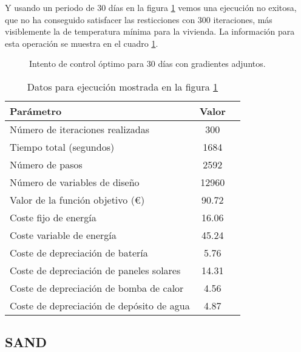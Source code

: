 Y usando un periodo de 30 días en la figura \ref{fig:control_adjoints_30_days}
vemos una ejecución no exitosa, que no ha conseguido satisfacer las
resticciones con 300 iteraciones, más visiblemente la de temperatura mínima
para la vivienda. La información para esta operación se muestra en el cuadro
\ref{tab:control_adjoints_30_days}.

\begin{figure}[h] \centering
	\centering
	
	\caption{Intento de control óptimo para 30 días con gradientes adjuntos.}
	\label{fig:control_adjoints_30_days}
\end{figure}

\begin{table}[ht]
	\centering
	\caption{Datos para ejecución mostrada en la figura \ref{fig:control_adjoints_30_days}}
	\label{tab:control_adjoints_30_days}
	\begin{tabular}{@{}lcc@{}}
		\toprule
		Parámetro                                 & Valor \\
		\midrule
		Número de iteraciones realizadas          & 300   \\
		Tiempo total (segundos)                   & 1684  \\
		Número de pasos                           & 2592  \\
		Número de variables de diseño             & 12960 \\
		\midrule
		Valor de la función objetivo (€)          & 90.72 \\
		\midrule
		Coste fijo de energía                     & 16.06 \\
		Coste variable de energía                 & 45.24 \\
		Coste de depreciación de batería          & 5.76  \\
		Coste de depreciación de paneles solares  & 14.31 \\
		Coste de depreciación de bomba de calor   & 4.56  \\
		Coste de depreciación de depósito de agua & 4.87  \\
		\bottomrule
	\end{tabular}
\end{table}





\clearpage
\subsection{SAND}

